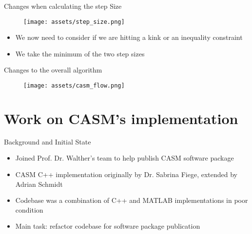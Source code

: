 \documentclass[aspectratio=169]{beamer}
\begin{document}
\begin{frame}{Changes when calculating the step Size}
    \begin{figure}
        \texttt{[image: assets/step\_size.png]}
    \end{figure}

    \begin{itemize}[<+(1)->]
        \item We now need to consider if we are hitting a kink or an inequality
              constraint
        \item We take the minimum of the two step sizes
    \end{itemize}
\end{frame}

\begin{frame}{Changes to the overall algorithm}
    \begin{figure}
        \texttt{[image: assets/casm\_flow.png]}
    \end{figure}
\end{frame}

\section{Work on CASM's implementation}

\begin{frame}{Background and Initial State}
    \begin{itemize}[<+->]
        \item Joined Prof. Dr. Walther's team to help publish CASM software
              package
        \item CASM C++ implementation originally by Dr. Sabrina Fiege, extended
              by Adrian Schmidt
        \item Codebase was a combination of C++ and MATLAB implementations in
              poor condition
        \item Main task: refactor codebase for software package publication
    \end{itemize}

\end{frame}
\end{document}

